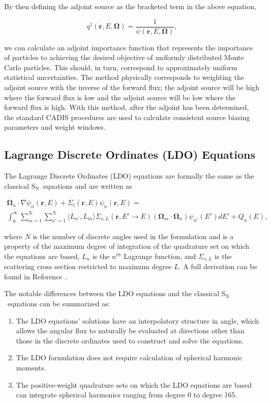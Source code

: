 \documentclass{article} %
\newcommand{\bo}{\mathbf\Omega}
\newcommand{\vecr}{\textbf{r}}
\newcommand{\sn}{S$_\mathrm{N}$}
\begin{document}
\noindent By then defining the adjoint source as the bracketed term in the
above equation,

\begin{equation}
q^{\dagger}(\vecr,E,\bo) = \frac{1}{\psi(\vecr,E,\bo)},
\end{equation}

\noindent we can calculate an adjoint importance function that represents the
importance of particles to achieving the desired objective of uniformly
distributed Monte Carlo particles. This should, in turn, correspond to
approximately uniform statistical uncertainties. The method physically 
corresponds to weighting the adjoint source with the inverse of the forward
flux; the adjoint source will be high where the forward flux is low and the
adjoint source will be low where the forward flux is high. With this method,
after the adjoint has been determined, the standard CADIS procedures are used
to calculate consistent source biasing parameters and weight windows.

\subsection{Lagrange Discrete Ordinates (LDO) Equations}

The Lagrange Discrete Ordinates (LDO) equations are formally the same as the
classical \sn\ equations and are written as

\begin{multline}
\bo_n\cdot\nabla\psi_{n}(\vecr,E) + 
\Sigma_{t}(\vecr,E)\psi_{n}(\vecr,E) = \\
\int_0^\infty\sum_{m=1}^{N}\sum_{n'=1}^{N}\langle L_{n'},L_{m}\rangle
\Sigma_{s,L}(\vecr,E'\rightarrow E)(\bo_{m}\cdot\bo_n)\psi_{n'}(E')dE'
+ Q_{n}(E),
\end{multline}

\noindent where $N$ is the number of discrete angles used in the formulation
and is a property of the maximum degree of integration of the quadrature set
on which the equations are based, $L_n$ is the $n^{th}$ Lagrange function, and
$\Sigma_{s,L}$ is the scattering cross section restricted to maximum degree
$L$. A full derivation can be found in Reference \cite{ahrens}.

The notable differences between the LDO equations and the classical \sn\
equations can be summarized as:

\begin{enumerate}
\item{The LDO equations' solutions have an interpolatory structure in angle,
      which allows the angular flux to naturally be evaluated at directions
      other than those in the discrete ordinates used to construct and solve
      the equations.}
\item{The LDO formulation does not require calculation of spherical harmonic
      moments.}
\item{The positive-weight quadrature sets on which the LDO equations are based
      can integrate spherical harmonics ranging from degree 0 to degree 165.}
\end{enumerate}
\end{document}
